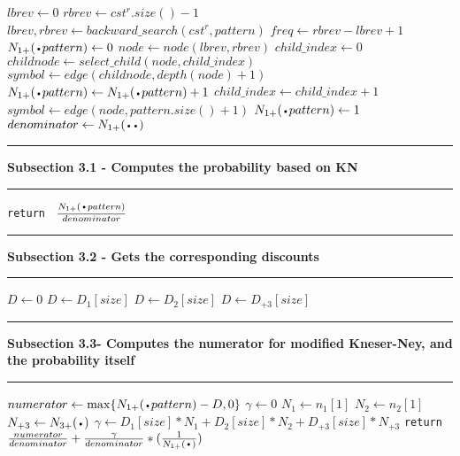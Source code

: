 \documentclass[11pt]{article}
\newcommand\Algphase[1]{%
\vspace*{-.7\baselineskip}\Statex\hspace*{\dimexpr-\algorithmicindent-2pt\relax}\rule{\textwidth}{0.1pt}%
\Statex\hspace*{-\algorithmicindent}\textbf{#1}%
\vspace*{-.7\baselineskip}\Statex\hspace*{\dimexpr-\algorithmicindent-2pt\relax}\rule{\textwidth}{0.1pt}%
}
\newcommand*{\LargerCdot}{\raisebox{-0.75ex}{\scalebox{2}{$\cdot$}}}
\begin{document}
\begin{algorithm*}\footnotesize
\begin{algorithmic}
    \State $lbrev\gets 0$
    \State $rbrev\gets cst^{r}.size()-1$
    \State $lbrev,rbrev\gets backward\_search(cst^{r},pattern)$
	\State $freq\gets rbrev-lbrev+1$
	\State $N_{1+}(\LargerCdot pattern)\gets 0$
    \State $node\gets node(lbrev,rbrev)$
		\State $child\_index\gets 0$
			\State $childnode\gets select\_child(node,child\_index)$
			\State $symbol\gets edge(childnode,depth(node)+1)$
			    \State $N_{1+}(\LargerCdot pattern)\gets N_{1+}(\LargerCdot pattern)+1$
			\EndIf	
		    \State $child\_index\gets child\_index+1$				
		\EndWhile
	\Else
		\State $symbol\gets edge(node,pattern.size()+1)$
	   		\State $N_{1+}(\LargerCdot pattern)\gets 1$
		\EndIf	
	\EndIf
	\State $denominator\gets N_{1+}(\LargerCdot\LargerCdot)$
    \Algphase{ Subsection 3.1 - Computes the probability based on KN}
	    \State \texttt{return } $\frac{N_{1+}(\LargerCdot pattern)}{denominator}$
	\Else
	\Algphase{ Subsection 3.2 - Gets the corresponding discounts}
	    \State $D\gets 0$
	        \State $D\gets D_1[size]$
	        \State $D\gets D_2[size]$
	        \State $D\gets D_{+3}[size]$
	    \EndIf
	\Algphase{ Subsection 3.3- Computes the numerator for modified Kneser-Ney, and the probability itself}
	    \State $numerator\gets \max\{N_{1+}(\LargerCdot pattern)-D,0\}$
        \State $\gamma\gets 0$
	    \State $N_1\gets n_1[1]$
	    \State $N_2\gets n_2[1]$
	    \State $N_{+3}\gets N_{3+}(\LargerCdot)$
	    \State $\gamma\gets D_1[size]*N_1 + D_2[size]*N_2 + D_{+3}[size]*N_{+3}$
	    \vspace{2mm}
        \State \texttt{return } $\frac{numerator}{denominator}+\frac{\gamma}{denominator}*(\frac{1}{N_{1+}(\LargerCdot)})$
        \vspace{1mm}
	\EndIf
\EndIf
\EndProcedure
\end{algorithmic}
\end{algorithm*}
\end{document}
